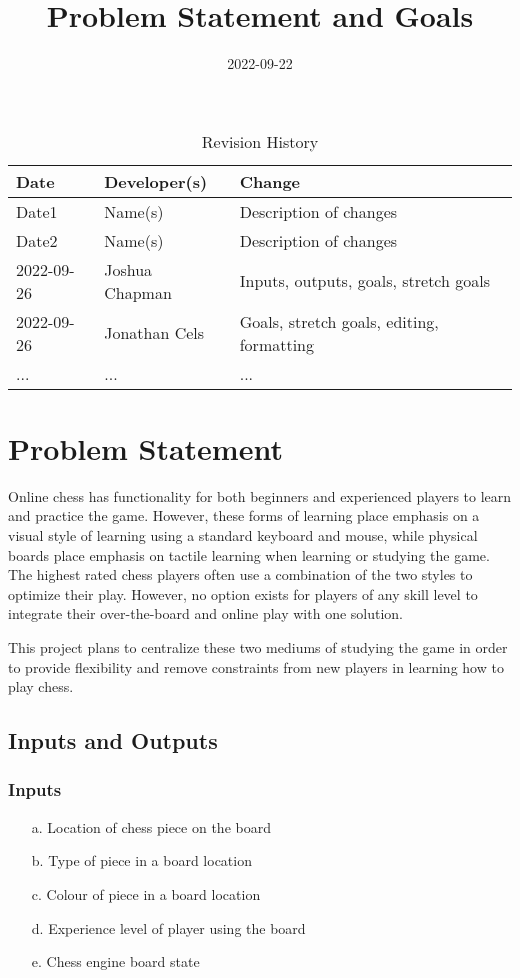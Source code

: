 \documentclass{article}
\title{Problem Statement and Goals\\\progname}
\author{\authname}
\date{2022-09-22}
\begin{document}
\maketitle

\begin{table}[hp]
\caption{Revision History} \label{TblRevisionHistory}
\begin{tabularx}{\textwidth}{llX}
\toprule
\textbf{Date} & \textbf{Developer(s)} & \textbf{Change}\\
\midrule
Date1 & Name(s) & Description of changes\\
Date2 & Name(s) & Description of changes\\
2022-09-26 & Joshua Chapman & Inputs, outputs, goals, stretch goals\\
2022-09-26 & Jonathan Cels & Goals, stretch goals, editing, formatting\\
... & ... & ...\\
\bottomrule
\end{tabularx}
\end{table}

\section{Problem Statement}

{Online chess has functionality for both beginners and experienced players to learn and practice the game. 
However, these forms of learning place emphasis on a visual style of learning using a standard keyboard and mouse, while physical boards place emphasis on tactile learning when learning or studying the game.
The highest rated chess players often use a combination of the two styles to optimize their play. However, no option exists for players of any skill level to integrate their over-the-board and online play with one solution.}

\medskip
{This project plans to centralize these two mediums of studying the game in order to provide flexibility and remove constraints from new players in learning how to play chess.}

\subsection{Inputs and Outputs}

\subsubsection{Inputs}
\begin{enumerate}
    \item[a.] Location of chess piece on the board
    \item[b.] Type of piece in a board location
    \item[c.] Colour of piece in a board location
    \item[d.] Experience level of player using the board
    \item[e.] Chess engine board state
\end{enumerate}
\end{document}
